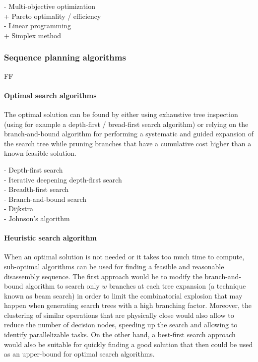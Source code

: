 - Multi-objective optimization\\
	+ Pareto optimality / efficiency\\
- Linear programming\\
	+ Simplex method\\



\subsubsection{Sequence planning algorithms}

FF


\paragraph{Optimal search algorithms}

The optimal solution can be found by either using exhaustive tree inspection (using for example a depth-first / bread-first search algorithm) or relying on the branch-and-bound algorithm \cite{Thomas2011,Thomas2015} for performing a systematic and guided expansion of the search tree while pruning branches that have a cumulative cost higher than a known feasible solution.

- Depth-first search\\
- Iterative deepening depth-first search\\
- Breadth-first search\\
- Branch-and-bound search\\
- Dijkstra\\
- Johnson's algorithm\\


\paragraph{Heuristic search algorithm}

When an optimal solution is not needed or it takes too much time to compute, sub-optimal algorithms can be used for finding a feasible and reasonable disassembly sequence. The first approach would be to modify the branch-and-bound algorithm \cite{Zhang2010} to search only $w$ branches at each tree expansion (a technique known as beam search) in order to limit the combinatorial explosion that may happen when generating search trees with a high branching factor. Moreover, the clustering of similar operations that are physically close would also allow to reduce the number of decision nodes, speeding up the search and allowing to identify parallelizable tasks. On the other hand, a best-first search approach would also be suitable for quickly finding a good solution that then could be used as an upper-bound for optimal search algorithms.

